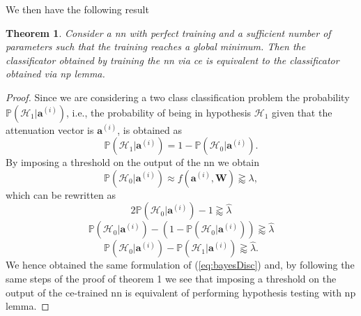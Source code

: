 \documentclass[draftcls,onecolumn,12pt]{IEEEtran}
\newtheorem{theorem}{Theorem}
\begin{document}
We then have the following result
\begin{theorem}
\label{th:nn_np2}
Consider a \ac{nn} with perfect training and a sufficient number of parameters such that the training reaches a global minimum. Then the classificator obtained by training the \ac{nn} via \ac{ce} is equivalent to the classificator obtained via \ac{np} lemma.
\end{theorem}
\begin{proof}
Since we are considering a two class classification problem the probability $\mathbb{P}(\mathcal{H}_1|\bm{a}^{(i)})$, i.e., the probability of being in hypothesis $\mathcal{H}_1$ given that the attenuation vector is $\bm{a}^{(i)}$, is obtained as
\begin{equation}
    \mathbb{P}(\mathcal{H}_1|\bm{a}^{(i)}) = 1- \mathbb{P}(\mathcal{H}_0|\bm{a}^{(i)}).
\end{equation}
By imposing a threshold on the output of the \ac{nn} we obtain
\begin{equation}
    \mathbb{P}(\mathcal{H}_0|\bm{a}^{(i)}) \approx  f(\bm{a}^{(i)},\bm{W}) \gtrapprox \lambda,
\end{equation}
which can be rewritten as
\begin{equation}
    2\mathbb{P}(\mathcal{H}_0|\bm{a}^{(i)})-1 \gtrapprox \hat{\lambda}
\end{equation}
\begin{equation}
    \mathbb{P}(\mathcal{H}_0|\bm{a}^{(i)})-(1-\mathbb{P}(\mathcal{H}_0|\bm{a}^{(i)})) \gtrapprox \hat{\lambda}
\end{equation}
\begin{equation}
    \mathbb{P}(\mathcal{H}_0|\bm{a}^{(i)})-\mathbb{P}(\mathcal{H}_1|\bm{a}^{(i)}) \gtrapprox \hat{\lambda}.
\end{equation}
We hence obtained the same formulation of (\ref{eq:bayesDisc}) and, by following the same steps of the proof of theorem 1 we see that imposing a threshold on the output of the \ac{ce}-trained \ac{nn} is equivalent of performing hypothesis testing with \ac{np} lemma.
\end{proof}
\end{document}
